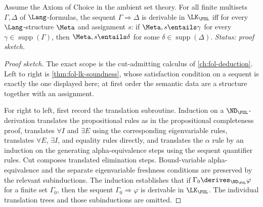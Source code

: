 \begin{theorem}
\label{thm:fol-lk-completeness}
Assume the Axiom of Choice in the ambient set theory.  For all finite
multisets \(\Gamma,\Delta\) of \(\Lang\)-formulas, the sequent
\(\Gamma\Rightarrow\Delta\) is derivable in \(\LK_{\FOL}\) iff for every
\(\Lang\)-structure \(\Meta\) and assignment \(s\): if
\(\Meta,s\entails\gamma\) for every
\(\gamma\in\operatorname{supp}(\Gamma)\), then
\(\Meta,s\entails\delta\) for some
\(\delta\in\operatorname{supp}(\Delta)\).
\textit{Status: proof sketch.}
\end{theorem}
\begin{proof}[Proof sketch]
The exact scope is the cut-admitting calculus of
\cref{ch:fol-deduction}.  Left to right is \cref{thm:fol-lk-soundness},
whose satisfaction condition on a sequent is exactly the one displayed
here; at first order the semantic data are a structure together with an
assignment.

For right to left, first record the translation subroutine.  Induction on
a \(\ND_{\FOL}\)-derivation translates the
propositional rules as in the propositional completeness proof, translates
\(\forall I\) and \(\exists E\) using the corresponding eigenvariable rules,
translates \(\forall E\), \(\exists I\), and equality rules directly, and
translates the \(\alpha\) rule by an induction on the generating
alpha-equivalence steps using the sequent quantifier rules.  Cut composes
translated elimination steps.  Bound-variable alpha-equivalence and the
separate eigenvariable freshness conditions are preserved by the relevant
subinductions.  The induction establishes that if
\(\Gamma_0\derives_{\ND_{\FOL}}\varphi\) for a finite set \(\Gamma_0\),
then the sequent \(\Gamma_0\Rightarrow\varphi\) is derivable in
\(\LK_{\FOL}\).  The individual translation trees and those subinductions
are omitted.


\end{proof}
